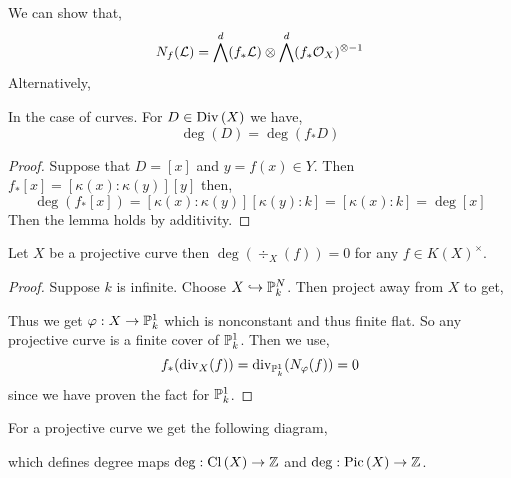 \documentclass[12pt]{article}
\begin{document}
\begin{rmk}
We can show that,
\[ N_f(\L) = \bigwedge^d (f_* \L) \otimes \bigwedge^d (f_* \struct{X})^{\otimes -1} \]
Alternatively, 
\end{rmk}

\begin{lemma}
In the case of curves. For $D \in \Div{X}$ we have,
\[ \deg{(D)} = \deg{(f_* D)} \]
\end{lemma}

\begin{proof}
Suppose that $D = [x]$ and $y = f(x) \in Y$. Then $f_* [x] = [\kappa(x) : \kappa(y)] [y]$ then,
\[ \deg{(f_* [x])} = [\kappa(x) : \kappa(y)] [\kappa(y) : k] = [\kappa(x) : k] = \deg{[x]} \]
Then the lemma holds by additivity. 
\end{proof}

\begin{cor}
Let $X$ be a projective curve then $\deg{(\div_X(f))} = 0$ for any $f \in K(X)^\times$.
\end{cor}

\begin{proof}
Suppose $k$ is infinite. Choose $X \embed \P_k^N$. Then project away from $X$ to get,
\begin{center}
\end{center}
Thus we get $\varphi : X \to \P^1_k$ which is nonconstant and thus finite flat. So any projective curve is a finite cover of $\P^1_k$. Then we use,
\[ f_* (\div_X(f)) = \div_{\P^1_k}(N_\varphi(f)) = 0 \]
since we have proven the fact for $\P^1_k$. 
\end{proof}

\begin{cor}
For a projective curve we get the following diagram,
\begin{center}
\end{center}
which defines degree maps $\deg : \Cl{X} \to \Z$ and $\deg : \Pic{X} \to \Z$. 
\end{cor}
\end{document}
